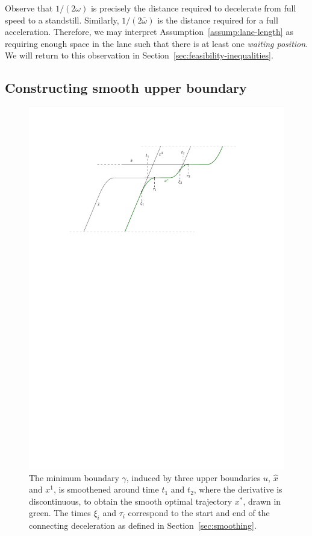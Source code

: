 \documentclass[a4paper]{article}
\theoremstyle{definition}
\theoremstyle{plain}
\begin{document}
\noindent
Observe that $1/(2\omega)$ is precisely the distance required to decelerate from
full speed to a standstill. Similarly, $1/(2\bar{\omega})$ is the distance
required for a full acceleration. Therefore, we may interpret
Assumption~\ref{assump:lane-length} as requiring enough space in the lane such
that there is at least one \emph{waiting position}.
%
We will return to this observation in
Section~\ref{sec:feasibility-inequalities}.


\subsection{Constructing smooth upper boundary}\label{sec:optimal-trajectory}

\begin{figure}
  \centering
  \includegraphics[scale=1]{figures/motion/proof}
  \caption{The minimum boundary $\gamma$, induced by three upper boundaries
    $u$, $\hat{x}$ and $x^{1}$, is smoothened around time $t_{1}$ and
    $t_{2}$, where the derivative is discontinuous, to obtain the smooth optimal
    trajectory $x^{*}$, drawn in green. The times $\xi_{i}$ and $\tau_{i}$
    correspond to the start and end of the connecting deceleration as
    defined in Section~\ref{sec:smoothing}.}%
  \label{fig:optimal-construction}
\end{figure}
\end{document}
